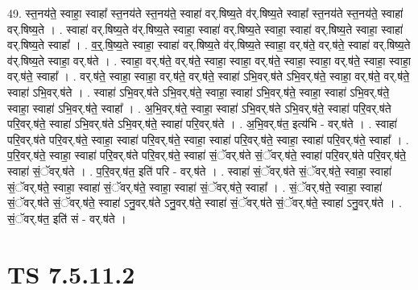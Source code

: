 \documentclass[17pt]{extarticle}
\begin{document}
49. स्त॒नय॑ते॒ स्वाहा॒ स्वाहा᳚ स्त॒नय॑ते स्त॒नय॑ते॒ स्वाहा॑ वर्.षिष्य॒ते व॑र्.षिष्य॒ते स्वाहा᳚ स्त॒नय॑ते स्त॒नय॑ते॒ स्वाहा॑ वर्.षिष्य॒ते । . स्वाहा॑ वर्.षिष्य॒ते व॑र्.षिष्य॒ते स्वाहा॒ स्वाहा॑ वर्.षिष्य॒ते स्वाहा॒ स्वाहा॑ वर्.षिष्य॒ते स्वाहा॒ स्वाहा॑ वर्.षिष्य॒ते स्वाहा᳚ । . व॒र्॒.षि॒ष्य॒ते स्वाहा॒ स्वाहा॑ वर्.षिष्य॒ते व॑र्.षिष्य॒ते स्वाहा॒ वर्.ष॑ते॒ वर्.ष॑ते॒ स्वाहा॑ वर्.षिष्य॒ते व॑र्.षिष्य॒ते स्वाहा॒ वर्.ष॑ते । . स्वाहा॒ वर्.ष॑ते॒ वर्.ष॑ते॒ स्वाहा॒ स्वाहा॒ वर्.ष॑ते॒ स्वाहा॒ स्वाहा॒ वर्.ष॑ते॒ स्वाहा॒ स्वाहा॒ वर्.ष॑ते॒ स्वाहा᳚ । . वर्.ष॑ते॒ स्वाहा॒ स्वाहा॒ वर्.ष॑ते॒ वर्.ष॑ते॒ स्वाहा॑ ऽभि॒वर्.ष॑ते ऽभि॒वर्.ष॑ते॒ स्वाहा॒ वर्.ष॑ते॒ वर्.ष॑ते॒ स्वाहा॑ ऽभि॒वर्.ष॑ते । . स्वाहा॑ ऽभि॒वर्.ष॑ते ऽभि॒वर्.ष॑ते॒ स्वाहा॒ स्वाहा॑ ऽभि॒वर्.ष॑ते॒ स्वाहा॒ स्वाहा॑ ऽभि॒वर्.ष॑ते॒ स्वाहा॒ स्वाहा॑ ऽभि॒वर्.ष॑ते॒ स्वाहा᳚ । . अ॒भि॒वर्.ष॑ते॒ स्वाहा॒ स्वाहा॑ ऽभि॒वर्.ष॑ते ऽभि॒वर्.ष॑ते॒ स्वाहा॑ परि॒वर्.ष॑ते परि॒वर्.ष॑ते॒ स्वाहा॑ ऽभि॒वर्.ष॑ते ऽभि॒वर्.ष॑ते॒ स्वाहा॑ परि॒वर्.ष॑ते । . अ॒भि॒वर्.ष॑त॒ इत्य॑भि - वर्.ष॑ते । . स्वाहा॑ परि॒वर्.ष॑ते परि॒वर्.ष॑ते॒ स्वाहा॒ स्वाहा॑ परि॒वर्.ष॑ते॒ स्वाहा॒ स्वाहा॑ परि॒वर्.ष॑ते॒ स्वाहा॒ स्वाहा॑ परि॒वर्.ष॑ते॒ स्वाहा᳚ । . प॒रि॒वर्.ष॑ते॒ स्वाहा॒ स्वाहा॑ परि॒वर्.ष॑ते परि॒वर्.ष॑ते॒ स्वाहा॑ सं॒ॅवर्.ष॑ते सं॒ॅवर्.ष॑ते॒ स्वाहा॑ परि॒वर्.ष॑ते परि॒वर्.ष॑ते॒ स्वाहा॑ सं॒ॅवर्.ष॑ते । . प॒रि॒वर्.ष॑त॒ इति॑ परि - वर्.ष॑ते । . स्वाहा॑ सं॒ॅवर्.ष॑ते सं॒ॅवर्.ष॑ते॒ स्वाहा॒ स्वाहा॑ सं॒ॅवर्.ष॑ते॒ स्वाहा॒ स्वाहा॑ सं॒ॅवर्.ष॑ते॒ स्वाहा॒ स्वाहा॑ सं॒ॅवर्.ष॑ते॒ स्वाहा᳚ । . सं॒ॅवर्.ष॑ते॒ स्वाहा॒ स्वाहा॑ सं॒ॅवर्.ष॑ते सं॒ॅवर्.ष॑ते॒ स्वाहा॑ ऽनु॒वर्.ष॑ते ऽनु॒वर्.ष॑ते॒ स्वाहा॑ सं॒ॅवर्.ष॑ते सं॒ॅवर्.ष॑ते॒ स्वाहा॑ ऽनु॒वर्.ष॑ते । . सं॒ॅवर्.ष॑त॒ इति॑ सं - वर्.ष॑ते । \newline
\pagebreak
{}

\section{ TS 7.5.11.2 }
\end{document}
